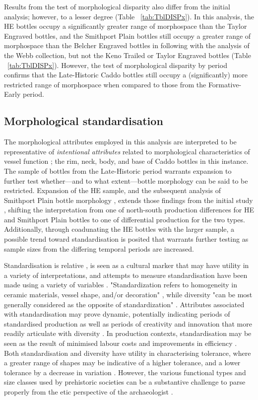 \documentclass[review]{elsarticle}
\begin{document}
Results from the test of morphological disparity also differ from the initial analysis; however, to a lesser degree (Table ~\ref{tab:TblDISPx}). In this analysis, the HE bottles occupy a significantly greater range of morphospace than the Taylor Engraved bottles, and the Smithport Plain bottles still occupy a greater range of morphospace than the Belcher Engraved bottles in following with the analysis of the Webb collection, but not the Keno Trailed or Taylor Engraved bottles \citep[Table 6]{RN11716} (Table ~\ref{tab:TblDISPx}). However, the test of morphological disparity by period confirms that the Late-Historic Caddo bottles still occupy a (significantly) more restricted range of morphospace when compared to those from the Formative-Early period.

\subsection{Morphological standardisation}

The morphological attributes employed in this analysis are interpreted to be representative of \textit{intentional attributes} related to morphological characteristics of vessel function \citep{RN250}; the rim, neck, body, and base of Caddo bottles in this instance. The sample of bottles from the Late-Historic period warrants expansion to further test whether---and to what extent---bottle morphology can be said to be restricted. Expansion of the HE sample, and the subsequent analysis of Smithport Plain bottle morphology \citep{RN11801}, extends those findings from the initial study \citep{RN11716}, shifting the interpretation from one of north-south production differences for HE and Smithport Plain bottles to one of differential production for the two types. Additionally, through coadunating the HE bottles with the larger sample, a possible trend toward standardisation is posited that warrants further testing as sample sizes from the differing temporal periods are increased.

Standardisation is relative \citep{RN387,RN13}, is seen as a cultural marker that may have utility in a variety of interpretations, and attempts to measure standardisation have been made using a variety of variables \citep{RN11808}. "Standardization refers to homogeneity in ceramic materials, vessel shape, and/or decoration" \citep[622]{RN28}, while diversity "can be most generally considered as the opposite of standardization" \citep[273]{RN18}. Attributes associated with standardisation may prove dynamic, potentially indicating periods of standardised production as well as periods of creativity and innovation that more readily articulate with diversity \citep{RN7}. In production contexts, standardisation may be seen as the result of minimised labour costs and improvements in efficiency \citep{RN13}. Both standardisation and diversity have utility in characterising tolerance, where a greater range of shapes may be indicative of a higher tolerance, and a lower tolerance by a decrease in variation \citep{RN35}. However, the various functional types and size classes used by prehistoric societies can be a substantive challenge to parse properly from the etic perspective of the archaeologist \citep{RN6008}.
\end{document}
